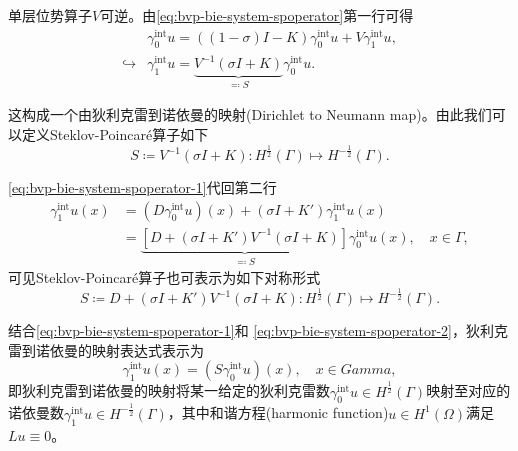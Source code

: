 单层位势算子$V$可逆。由\eqref{eq:bvp-bie-system-spoperator}第一行可得
\begin{equation}
  \label{eq:bvp-bie-system-spoperator-1}
\begin{split}
    & \gamma_{0}^{\text{int}} u = \left( \left( 1- \sigma \right) I - K \right) \gamma_{0}^{\text{int}} u + V \gamma_{1}^{\text{int}} u, \\
    \hookrightarrow & \gamma_{1}^{\text{int}} u = \underbrace{
    V^{-1} \left( \sigma I + K \right)
    }_{\eqqcolon S} \gamma_{0}^{\text{int}} u.
\end{split}
\end{equation}

这构成一个由狄利克雷到诺依曼的映射(Dirichlet to Neumann map)\citep{Behrndt:2015kq}。由此我们可以定义Steklov-Poincaré算子如下
\begin{equation}
  \label{eq:bvp-bie-system-spoperator-def}
  S \coloneqq V^{-1} \left( \sigma I + K \right) : H^{\frac{1}{2}}(\Gamma) \mapsto H^{-\frac{1}{2}}(\Gamma).
\end{equation}

\eqref{eq:bvp-bie-system-spoperator-1}代回第二行
\begin{equation}
  \label{eq:bvp-bie-system-spoperator-2}
  \begin{split}
    \gamma_{1}^{\text{int}} u(x) &=
    \left( D \gamma_{0}^{\text{int}} u \right)(x)
    + \left( \sigma I + K' \right) \gamma_{1}^{\text{int}} u(x) \\
    & = \underbrace{
    \left[
    D + \left( \sigma I + K' \right) V^{-1} \left( \sigma I + K \right)
    \right]
    }_{\eqqcolon S}
    \gamma_{0}^{\text{int}} u(x), \quad x \in \Gamma,
  \end{split}
\end{equation}
可见Steklov-Poincaré算子也可表示为如下对称形式
\begin{equation}
    \label{eq:bvp-bie-system-spoperator-def-sym}
    S \coloneqq     D + \left( \sigma I + K' \right) V^{-1} \left( \sigma I + K \right) : H^{\frac{1}{2}}(\Gamma) \mapsto H^{-\frac{1}{2}}(\Gamma).
\end{equation}

结合\eqref{eq:bvp-bie-system-spoperator-1}和  \eqref{eq:bvp-bie-system-spoperator-2}，狄利克雷到诺依曼的映射表达式表示为
\begin{equation}
  \gamma_{1}^{\text{int}} u(x) = \left( S \gamma_{0}^{\text{int}} u \right)(x), \quad x \in Gamma,
\end{equation}
即狄利克雷到诺依曼的映射将某一给定的狄利克雷数$\gamma_{0}^{\text{int}} u \in H^{\frac{1}{2}}(\Gamma)$映射至对应的诺依曼数$\gamma_{1}^{\text{int}} u \in H^{-\frac{1}{2}}(\Gamma)$，其中和谐方程(harmonic function)$u \in H^{1}(\Omega)$满足$L u \equiv 0$。
